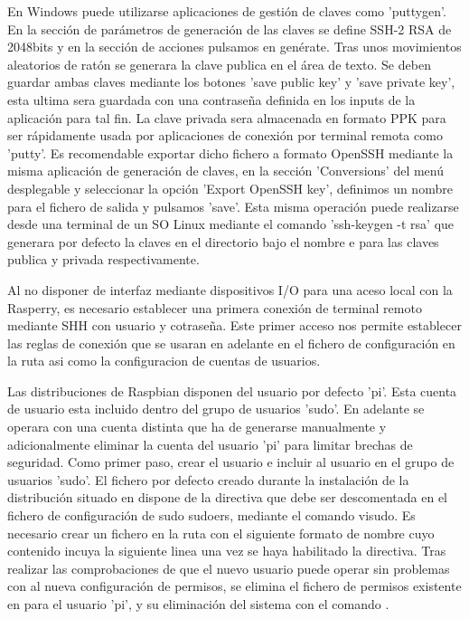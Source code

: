En Windows puede utilizarse aplicaciones de gestión de claves como 'puttygen'. En la sección de parámetros de generación de las claves se define SSH-2 RSA de 2048bits y en la sección de acciones pulsamos en genérate. Tras unos movimientos aleatorios de ratón se generara la clave publica en el área de texto. Se deben guardar ambas claves mediante los botones 'save public key' y 'save private key', esta ultima sera guardada con una contraseña definida en los inputs de la aplicación para tal fin. La clave privada sera almacenada en formato PPK para ser rápidamente usada por aplicaciones de conexión por terminal remota como 'putty'. Es recomendable exportar dicho fichero a formato OpenSSH mediante la misma aplicación de generación de claves, en la sección 'Conversions' del menú desplegable y seleccionar la opción 'Export OpenSSH key', definimos  un nombre para el fichero de salida y pulsamos 'save'. Esta misma operación puede realizarse desde una terminal de un SO Linux mediante el comando 'ssh-keygen -t rsa' que generara por defecto la claves en el directorio  bajo el nombre  e  para las claves publica y privada respectivamente.

Al no disponer de interfaz mediante dispositivos I/O para una aceso local con la Rasperry, es necesario establecer una primera conexión de terminal remoto mediante SHH con usuario y cotraseña. Este primer acceso nos permite establecer las reglas de conexión que se usaran en adelante en el fichero de configuración en la ruta  asi como la configuracion de cuentas de usuarios.

Las distribuciones de Raspbian disponen del usuario por defecto 'pi'. Esta cuenta de usuario esta incluido dentro del grupo de usuarios 'sudo'. En adelante se operara con una cuenta distinta que ha de generarse manualmente y adicionalmente eliminar la cuenta del usuario 'pi' para limitar brechas de seguridad. Como primer paso, crear el usuario  e incluir al usuario en el grupo de usuarios 'sudo'. El fichero por defecto creado durante la instalación de la distribución situado en  dispone de la directiva  que debe ser descomentada en el fichero de configuración de sudo sudoers, mediante el comando visudo. Es necesario crear un fichero en la ruta  con el siguiente formato de nombre  cuyo contenido incuya la siguiente linea  una vez se haya habilitado la directiva. Tras realizar las comprobaciones de que el nuevo usuario puede operar sin problemas con al nueva configuración de permisos, se elimina el fichero de permisos existente en  para el usuario 'pi', y su eliminación del sistema con el comando .


